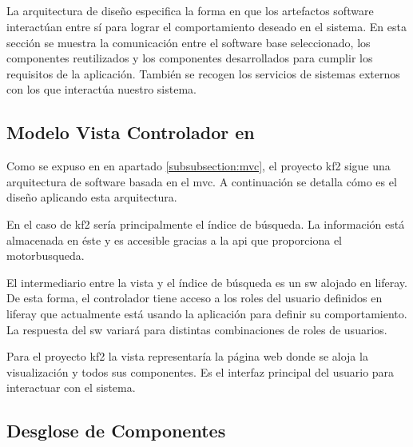 \subsection{} 

La arquitectura de diseño especifica la forma en que los artefactos software interactúan entre sí para lograr el comportamiento deseado en el sistema. En esta sección se muestra la comunicación entre el software base seleccionado, los componentes reutilizados y los componentes desarrollados para cumplir los requisitos de la aplicación. También se recogen los servicios de sistemas externos con los que interactúa nuestro sistema.\\


\subsection{Modelo Vista Controlador en \kfII}
Como se expuso en en apartado \ref{subsubsection:mvc}, el proyecto \gls{kf2} sigue una arquitectura de \gls{software} basada en el \gls{mvc}. A continuación se detalla cómo es el diseño aplicando esta arquitectura.



\begin{itemize}
    En el caso de \gls{kf2} sería principalmente el índice de búsqueda. La información está almacenada en éste y es accesible gracias a la \gls{api} que proporciona el \gls{motorbusqueda}. 
    
    El intermediario entre la vista y el índice de búsqueda es un 
\gls{sw} alojado en \gls{liferay}. De esta forma, el controlador tiene acceso a los roles del usuario definidos en \gls{liferay} que actualmente está usando la aplicación para definir su comportamiento. La respuesta del \gls{sw} variará para distintas combinaciones de roles de usuarios.
    
    Para el proyecto \gls{kf2} la vista representaría la página web donde se aloja la visualización y todos sus componentes. Es el interfaz principal del usuario para interactuar con el sistema.
\end{itemize}


\subsection{Desglose de Componentes}
\label{section:blocks}

